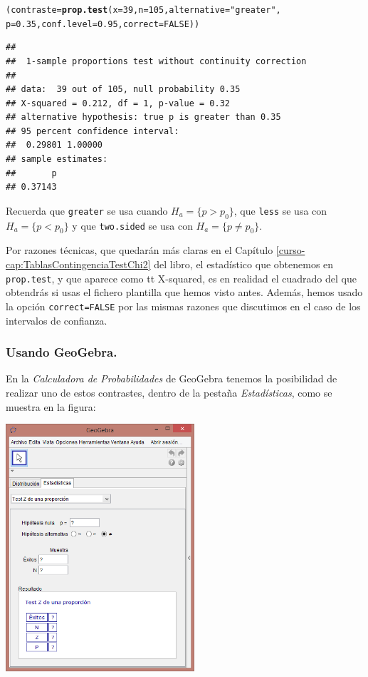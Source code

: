 \documentclass[10pt,a4paper]{article}\usepackage[]{graphicx}\usepackage[]{color}
\makeatletter
\newcommand{\hlnum}[1]{\textcolor[rgb]{0.686,0.059,0.569}{#1}}%
\newcommand{\hlstr}[1]{\textcolor[rgb]{0.192,0.494,0.8}{#1}}%
\newcommand{\hlstd}[1]{\textcolor[rgb]{0.345,0.345,0.345}{#1}}%
\newcommand{\hlkwb}[1]{\textcolor[rgb]{0.69,0.353,0.396}{#1}}%
\newcommand{\hlkwc}[1]{\textcolor[rgb]{0.333,0.667,0.333}{#1}}%
\newcommand{\hlkwd}[1]{\textcolor[rgb]{0.737,0.353,0.396}{\textbf{#1}}}%
\newenvironment{kframe}{%
 \def\at@end@of@kframe{}%
 \ifinner\ifhmode%
  \def\at@end@of@kframe{\end{minipage}}%
  \begin{minipage}{\columnwidth}%
 \fi\fi%
 \def\FrameCommand##1{\hskip\@totalleftmargin \hskip-\fboxsep
 \colorbox{shadecolor}{##1}\hskip-\fboxsep
     \hskip-\linewidth \hskip-\@totalleftmargin \hskip\columnwidth}%
 \MakeFramed {\advance\hsize-\width
   \@totalleftmargin\z@ \linewidth\hsize
   \@setminipage}}%
 {\par\unskip\endMakeFramed%
 \at@end@of@kframe}
\newenvironment{knitrout}{}{} %
\newcounter {cont01}
\makeatother
\begin{document}
\begin{knitrout}
\color{fgcolor}\begin{kframe}
\begin{alltt}
\hlstd{(contraste} \hlkwb{=} \hlkwd{prop.test}\hlstd{(}\hlkwc{x}\hlstd{=}\hlnum{39}\hlstd{,} \hlkwc{n}\hlstd{=}\hlnum{105}\hlstd{,} \hlkwc{alternative} \hlstd{=} \hlstr{"greater"}\hlstd{,}
                      \hlkwc{p}\hlstd{=}\hlnum{0.35}\hlstd{,} \hlkwc{conf.level} \hlstd{=} \hlnum{0.95}\hlstd{,} \hlkwc{correct} \hlstd{=} \hlnum{FALSE}\hlstd{))}
\end{alltt}
\begin{verbatim}
## 
## 	1-sample proportions test without continuity correction
## 
## data:  39 out of 105, null probability 0.35
## X-squared = 0.212, df = 1, p-value = 0.32
## alternative hypothesis: true p is greater than 0.35
## 95 percent confidence interval:
##  0.29801 1.00000
## sample estimates:
##       p 
## 0.37143
\end{verbatim}
\end{kframe}
\end{knitrout}
Recuerda que {\tt greater} se usa cuando $H_a=\{p > p_0\}$, que {\tt less} se usa con $H_a=\{p < p_0\}$ y que {\tt two.sided} se usa con $H_a=\{p \neq p_0\}$.

Por razones técnicas, que quedarán más claras en el Capítulo \ref{curso-cap:TablasContingenciaTestChi2} del libro, el estadístico que obtenemos en {\tt prop.test}, y que aparece como {tt X-squared}, es en realidad el cuadrado del que obtendrás si usas el fichero plantilla que hemos visto antes. Además, hemos usado la opción {\tt correct=FALSE} por las mismas razones que discutimos en el caso de los intervalos de confianza.


\subsubsection*{Usando GeoGebra.}

En la {\em Calculadora  de Probabilidades} de GeoGebra tenemos la posibilidad de realizar uno de estos contrastes, dentro de la pestaña {\em Estadísticas}, como se muestra en la figura:
\begin{center}
    \includegraphics[width=7cm]{../fig/Tut08-01.png}
\end{center}
\end{document}
